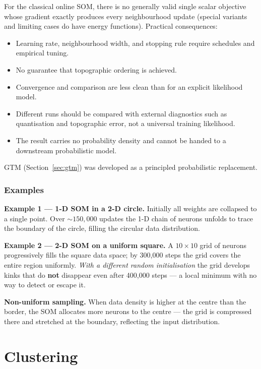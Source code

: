 \documentclass[11pt, oneside]{book}
\begin{document}
\begin{notebox}[title={SOM has no objective function}]
For the classical online SOM, there is no generally valid single scalar objective whose
gradient exactly produces every neighbourhood update (special variants and limiting
cases do have energy functions).
Practical consequences:
\begin{itemize}
  \item Learning rate, neighbourhood width, and stopping rule require schedules and
        empirical tuning.
  \item No guarantee that topographic ordering is achieved.
  \item Convergence and comparison are less clean than for an explicit likelihood model.
  \item Different runs should be compared with external diagnostics such as quantisation
        and topographic error, not a universal training likelihood.
  \item The result carries no probability density and cannot be handed to a
        downstream probabilistic model.
\end{itemize}
GTM (Section~\ref{sec:gtm}) was developed as a principled probabilistic
replacement.
\end{notebox}

\subsection{Examples}

\textbf{Example 1 — 1-D SOM in a 2-D circle.}
Initially all weights are collapsed to a single point.
Over ${\sim}150{,}000$ updates the 1-D chain of neurons unfolds to trace
the boundary of the circle, filling the circular data distribution.

\textbf{Example 2 — 2-D SOM on a uniform square.}
A $10\times 10$ grid of neurons progressively fills the square data space;
by 300{,}000 steps the grid covers the entire region uniformly.
\emph{With a different random initialisation} the grid develops kinks that
do \textbf{not} disappear even after 400{,}000 steps — a local minimum
with no way to detect or escape it.

\textbf{Non-uniform sampling.}
When data density is higher at the centre than the border, the SOM
allocates more neurons to the centre — the grid is compressed there and
stretched at the boundary, reflecting the input distribution.


\chapter{Clustering}
\end{document}
